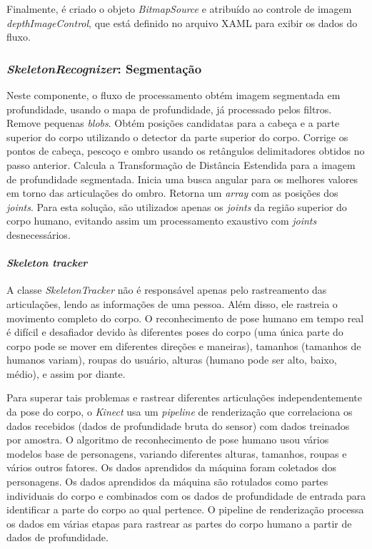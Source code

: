 Finalmente, é criado o objeto \textit{BitmapSource} e atribuído ao controle de imagem \textit{depthImageControl}, que está definido no arquivo XAML para exibir os dados do fluxo.

\subsubsection{\textit{SkeletonRecognizer}: Segmentação}\label{sec:skeleton}

Neste componente, o fluxo de processamento obtém imagem segmentada em profundidade, usando o mapa de profundidade, já processado pelos filtros. Remove pequenas \textit{blobs}. Obtém posições candidatas para a cabeça e a parte superior do corpo utilizando o detector da parte superior do corpo. Corrige os pontos de cabeça, pescoço e ombro usando os retângulos delimitadores obtidos no passo anterior. Calcula a Transformação de Distância Estendida para a imagem de profundidade segmentada. Inicia uma busca angular para os melhores valores em torno das articulações do ombro. Retorna um \textit{array} com as posições dos \textit{joints}. Para esta solução, são utilizados apenas os \textit{joints} da região superior do corpo humano, evitando assim um processamento exaustivo com \textit{joints} desnecessários.

\paragraph{\textit{Skeleton tracker}}\label{sec:SkeletonTracker}
A classe \textit{SkeletonTracker} não é responsável apenas pelo rastreamento das articulações, lendo as informações de uma pessoa. Além disso, ele rastreia o movimento completo do corpo. O reconhecimento de pose humano em tempo real é difícil e desafiador devido às diferentes poses do corpo (uma única parte do corpo pode se mover em diferentes direções e maneiras), tamanhos (tamanhos de humanos variam), roupas do usuário, alturas (humano pode ser alto, baixo, médio), e assim por diante.

Para superar tais problemas e rastrear diferentes articulações independentemente da pose do corpo, o \textit{Kinect} usa um \textit{pipeline} de renderização que correlaciona os dados recebidos (dados de profundidade bruta do sensor) com dados treinados por amostra. O algoritmo de reconhecimento de pose humano usou vários modelos base de personagens, variando diferentes alturas, tamanhos, roupas e vários outros fatores. Os dados aprendidos da máquina foram coletados dos personagens. Os dados aprendidos da máquina são rotulados como partes individuais do corpo e combinados com os dados de profundidade de entrada para identificar a parte do corpo ao qual pertence. O pipeline de renderização processa os dados em várias etapas para rastrear as partes do corpo humano a partir de dados de profundidade.


